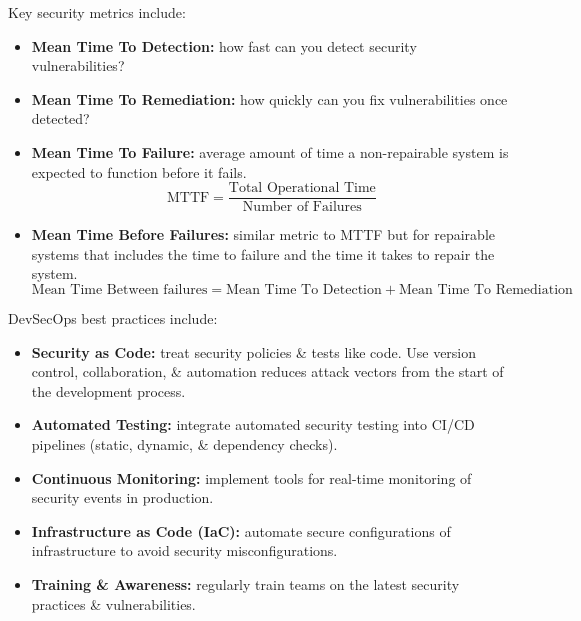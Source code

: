 \documentclass[a4paper,11pt]{article}
\begin{document}
Key security metrics include:
\begin{itemize}
    \item   \textbf{Mean Time To Detection:} how fast can you detect security vulnerabilities?
    \item   \textbf{Mean Time To Remediation:} how quickly can you fix vulnerabilities once detected?
    \item   \textbf{Mean Time To Failure:} average amount of time a non-repairable system is expected to function before it fails.
            $$
            \text{MTTF} = \frac{\text{Total Operational Time}}{\text{Number of Failures}}
            $$
    \item   \textbf{Mean Time Before Failures:} similar metric to MTTF but for repairable systems that includes the time to failure and the time it takes to repair the system.
            $$
            \text{Mean Time Between failures} = \text{Mean Time To Detection} + \text{Mean Time To Remediation}
            $$
\end{itemize}

DevSecOps best practices include:
\begin{itemize}
    \item   \textbf{Security as Code:} treat security policies \& tests like code.
            Use version control, collaboration, \& automation reduces attack vectors from the start of the development process.
    \item   \textbf{Automated Testing:} integrate automated security testing into CI/CD pipelines (static, dynamic, \& dependency checks).

    \item   \textbf{Continuous Monitoring:} implement tools for real-time monitoring of security events in production.

    \item   \textbf{Infrastructure as Code (IaC):} automate secure configurations of infrastructure to avoid security misconfigurations.

    \item   \textbf{Training \& Awareness:} regularly train teams on the latest security practices \& vulnerabilities.
\end{itemize}
\end{document}
